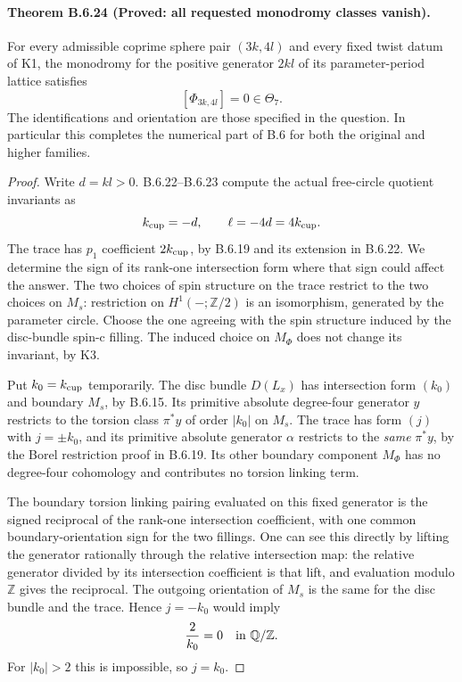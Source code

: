 \paragraph{Theorem B.6.24 (Proved: all requested monodromy classes vanish).}
For every admissible coprime sphere pair $(3k,4l)$ and every
fixed twist datum of K1, the monodromy for the positive
generator $2kl$ of its parameter-period lattice satisfies
\[
                    [\Phi_{3k,4l}]=0\in\Theta_7.
 \tag{B.6.43}
\]
The identifications and orientation are those specified in
the question.  In particular this completes the numerical
part of B.6 for both the original and higher families.
\begin{proof}
Write $d=kl>0$.  B.6.22--B.6.23 compute the actual
free-circle quotient invariants as
\[
              k_{\rm cup}=-d,\qquad \ell=-4d=4k_{\rm cup}.
\]
The trace has $p_1$ coefficient $2k_{\rm cup}$, by
B.6.19 and its extension in B.6.22.  We determine the
sign of its rank-one intersection form where that sign
could affect the answer.
The two choices of spin structure on the trace restrict
to the two choices on $M_s$: restriction on $H^1(-;\mathbb Z/2)$
is an isomorphism, generated by the parameter circle.
Choose the one agreeing with the spin structure induced
by the disc-bundle spin-c filling.  The induced choice
on $M_\Phi$ does not change its invariant, by K3.

Put $k_0=k_{\rm cup}$ temporarily.  The disc bundle
$D(L_x)$ has intersection form $(k_0)$ and boundary
$M_s$, by B.6.15.  Its primitive absolute degree-four
generator $y$ restricts to the torsion class $\pi^*y$
of order $|k_0|$ on $M_s$.  The trace has form $(j)$
with $j=\pm k_0$, and its primitive absolute generator
$\alpha$ restricts to the \emph{same} $\pi^*y$,
by the Borel restriction proof in B.6.19.  Its other
boundary component $M_\Phi$ has no degree-four
cohomology and contributes no torsion linking term.

The boundary torsion linking pairing evaluated on this
fixed generator is the signed reciprocal of the
rank-one intersection coefficient, with one common
boundary-orientation sign for the two fillings.
One can see this directly by lifting the generator
rationally through the relative intersection map:
the relative generator divided by its intersection
coefficient is that lift, and evaluation modulo
$\mathbb Z$ gives the reciprocal.  The outgoing
orientation of $M_s$ is the same for the disc bundle
and the trace.  Hence $j=-k_0$ would imply
\[
                         \frac{2}{k_0}=0\quad\hbox{in }\mathbb Q/\mathbb Z.
\]
For $|k_0|>2$ this is impossible, so $j=k_0$.


\end{proof}
